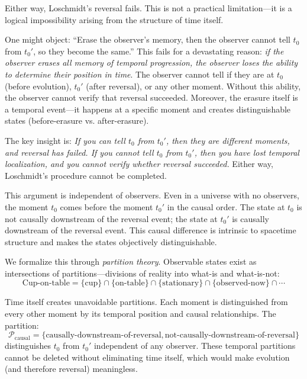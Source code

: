 \documentclass[twocolumn,10pt]{article}
\theoremstyle{definition}
\theoremstyle{remark}
\begin{document}
\vspace{0.2cm}
\noindent Either way, Loschmidt's reversal fails. This is not a practical limitation—it is a logical impossibility arising from the structure of time itself.

\vspace{0.2cm}
\noindent One might object: ``Erase the observer's memory, then the observer cannot tell $t_0$ from $t_0'$, so they become the same.'' This fails for a devastating reason: \textit{if the observer erases all memory of temporal progression, the observer loses the ability to determine their position in time}. The observer cannot tell if they are at $t_0$ (before evolution), $t_0'$ (after reversal), or any other moment. Without this ability, the observer cannot verify that reversal succeeded. Moreover, the erasure itself is a temporal event—it happens at a specific moment and creates distinguishable states (before-erasure vs. after-erasure).

\vspace{0.2cm}
\noindent The key insight is: \textit{If you can tell $t_0$ from $t_0'$, then they are different moments, and reversal has failed. If you cannot tell $t_0$ from $t_0'$, then you have lost temporal localization, and you cannot verify whether reversal succeeded.} Either way, Loschmidt's procedure cannot be completed.

\vspace{0.2cm}
\noindent This argument is independent of observers. Even in a universe with no observers, the moment $t_0$ comes before the moment $t_0'$ in the causal order. The state at $t_0$ is not causally downstream of the reversal event; the state at $t_0'$ is causally downstream of the reversal event. This causal difference is intrinsic to spacetime structure and makes the states objectively distinguishable.

\vspace{0.2cm}
\noindent We formalize this through \textit{partition theory}. Observable states exist as intersections of partitions—divisions of reality into what-is and what-is-not:
\begin{equation}
\text{Cup-on-table} = \{\text{cup}\} \cap \{\text{on-table}\} \cap \{\text{stationary}\} \cap \{\text{observed-now}\} \cap \cdots
\end{equation}

\noindent Time itself creates unavoidable partitions. Each moment is distinguished from every other moment by its temporal position and causal relationships. The partition:
\begin{equation}
\mathcal{P}_{\text{causal}} = \{\text{causally-downstream-of-reversal}, \text{not-causally-downstream-of-reversal}\}
\end{equation}
distinguishes $t_0$ from $t_0'$ independent of any observer. These temporal partitions cannot be deleted without eliminating time itself, which would make evolution (and therefore reversal) meaningless.
\end{document}
